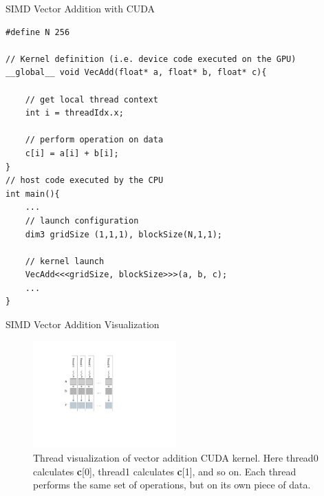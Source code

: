 \documentclass[handout]{beamer}
\begin{document}
\begin{frame}[fragile]{SIMD Vector Addition with CUDA}
\begin{lstlisting}[caption={A SIMD example for vector addition using CUDA}]
#define N 256

// Kernel definition (i.e. device code executed on the GPU)
__global__ void VecAdd(float* a, float* b, float* c){

    // get local thread context
    int i = threadIdx.x;
    
    // perform operation on data
    c[i] = a[i] + b[i];
}
// host code executed by the CPU
int main(){
    ...
    // launch configuration
    dim3 gridSize (1,1,1), blockSize(N,1,1);
    
    // kernel launch
    VecAdd<<<gridSize, blockSize>>>(a, b, c);
    ...
}
\end{lstlisting}
\end{frame}

\begin{frame}{SIMD Vector Addition Visualization}
\begin{figure}
\begin{center}
\includegraphics[width=5.5cm]{../media/vector_add_cuda.pdf}
\caption{Thread visualization of vector addition CUDA kernel.  Here thread0 calculates {\selectfont \textbf{c}[0]}, thread1 calculates {\selectfont \textbf{c}[1]}, and so on.  Each thread performs the same set of operations, but on its own piece of data.}
\end{center}
\end{figure}
\end{frame}
\end{document}
